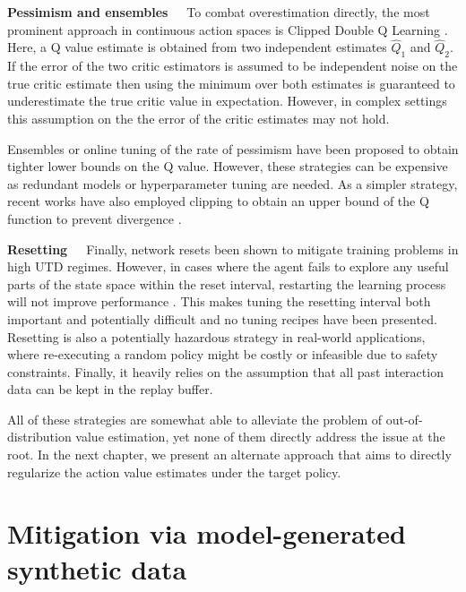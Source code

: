 \textbf{Pessimism and ensembles}~~~To combat overestimation directly, the most prominent approach in continuous action spaces is Clipped Double Q Learning \parencite{fujimoto2018addressing}. 
Here, a Q value estimate is obtained from two independent estimates $\hat{Q}_1$ and $\hat{Q}_2$.
If the error of the two critic estimators is assumed to be independent noise on the true critic estimate 
then using the minimum over both estimates is guaranteed to underestimate the true critic value in expectation.
However, in complex settings this assumption on the the error of the critic estimates may not hold. 

Ensembles \parencite{lan2020maxmin,chen2020randomized,hiraoka2022dropout,farebrother2023protovalue} or online tuning of the rate of pessimism \parencite{moskovitz2021tactical} have been proposed to obtain tighter lower bounds on the Q value.
However, these strategies can be expensive as redundant models or hyperparameter tuning are needed.
As a simpler strategy, recent works have also employed clipping to obtain an upper bound of the Q function to prevent divergence \parencite{fujimoto2024sale}.

\textbf{Resetting}~~~Finally, network resets been shown to mitigate training problems \parencite{nikishin2022primacy,doro2023barrier,schwarzer2023bigger,nauman2024bigger} in high UTD regimes.
However, in cases where the agent fails to explore any useful parts of the state space within the reset interval, restarting the learning process will not improve performance \parencite{hussing2024dissecting}.
This makes tuning the resetting interval both important and potentially difficult and no tuning recipes have been presented.
Resetting is also a potentially hazardous strategy in real-world applications, where re-executing a random policy might be costly or infeasible due to safety constraints.
Finally, it heavily relies on the assumption that all past interaction data can be kept in the replay buffer.

All of these strategies are somewhat able to alleviate the problem of out-of-distribution value estimation, yet none of them directly address the issue at the root.
In the next chapter, we present an alternate approach that aims to directly regularize the action value estimates under the target policy.

\section{Mitigation via model-generated synthetic data}

